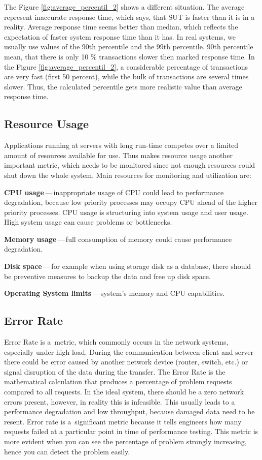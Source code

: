 The Figure \ref{fig:average_percentil_2} shows a different situation. The average represent inaccurate response time, which says, that SUT is faster than it is in a reality. Average response time seems better than median, which reflects the expectation of faster system response time than it has. In real systems, we usually use values of the 90th percentile and the 99th percentile. 90th percentile mean, that there is only 10 \% transactions slower then marked response time. In the Figure \ref{fig:average_percentil_2}, a considerable percentage of transactions are very fast (first 50 percent), while the bulk of transactions are several times slower. Thus, the calculated percentile gets more realistic value than average response time.

\subsection{Resource Usage}
Applications running at servers with long run-time competes over a limited amount of resources available for use. Thus makes resource usage another important metric, which needs to be monitored since not enough resources could shut down the whole system. Main resources for monitoring and utilization are:

\begin{description}
	\setlength\itemsep{0em}
	\item \textbf{CPU usage}\,---\,inappropriate usage of CPU could lead to performance degradation, because low priority processes may occupy CPU ahead of the higher priority processes. CPU usage is structuring into system usage and user usage. High system usage can cause problems or bottlenecks.
	\item \textbf{Memory usage}\,---\,full consumption of memory could cause performance degradation.
	\item \textbf{Disk space}\,---\,for example when using storage disk as a database, there should be preventive measures to backup the data and free up disk space.
	\item \textbf{Operating System limits}\,---\,system's memory and CPU capabilities.
\end{description}


\subsection{Error Rate}
Error Rate is a~metric, which commonly occurs in the network systems, especially under high load. During the communication between client and server there could be error caused by another network device (router, switch, etc.) or signal disruption of the data during the transfer. The Error Rate is the mathematical calculation that produces a percentage of problem requests compared to all requests. In the ideal system, there should be a zero network errors present, however, in reality this is infeasible. This usually leads to a performance degradation and low throughput, because damaged data need to be resent.
Error rate is a~significant metric because it tells engineers how many requests failed at a particular point in time of performance testing. This metric is more evident when you can see the percentage of problem strongly increasing, hence you can detect the problem easily.
